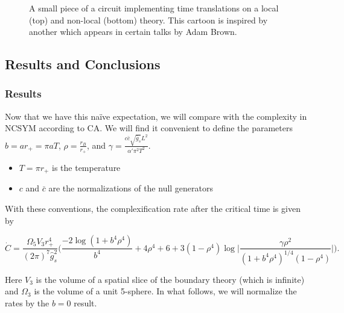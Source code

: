 \documentclass[8pt,aspectratio=169]{beamer}
\begin{document}
\begin{frame}
\begin{minipage}[t]{0.48\linewidth}
\begin{figure}
\begin{center}
    \end{center}
    \caption{A small piece of a circuit implementing time translations on a local (top) and non-local (bottom) theory. This cartoon is inspired by another which appears in certain talks by Adam Brown.}
\end{figure}

\end{minipage}

\end{frame}

\subsection{Results and Conclusions}

\begin{frame}
\frametitle{Results}

Now that we have this na\"ive expectation, we will compare with the complexity in NCSYM according to CA. We will find it convenient to define the parameters $b = a r_+ = \pi a T$,  $\rho = \frac{r_B}{r_+}$, and  $\gamma = \frac{c \bar{c} \sqrt{\bar{g}_s} L^2}{\alpha' \pi^2 T^2}$.
\begin{itemize}

\item $T=\pi r_+$ is the temperature

\item $c$ and $\bar{c}$ are the normalizations of the null generators

\end{itemize}

With these conventions, the complexification rate after the critical time is given by

\begin{equation}
\dot{C} = \frac{\Omega_5 V_3 r_+^4}{(2\pi)^7 \hat{g}_s^2}
\bigg(\frac{-2\log(1+b^4 \rho^4)}{b^4}+4\rho^4+6+3(1-\rho^4)\log\big|\frac{\gamma \rho^2}{(1+b^4 \rho^4)^{1/4}(1-\rho^4)}\big|\bigg).
\end{equation}

Here $V_3$ is the volume of a spatial slice of the boundary theory (which is infinite) and $\Omega_3$ is the volume of a unit 5-sphere. In what follows, we will normalize the rates by the $b=0$ result. 

\end{frame}
\end{document}

